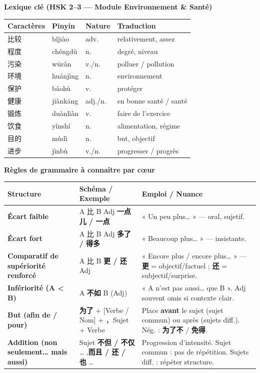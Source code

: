 \documentclass[11pt]{article}
\begin{document}
\begin{bilan}

\textbf{Lexique clé (HSK 2–3 — Module Environnement \& Santé)}
\begin{center}
\begin{tabularx}{\linewidth}{|X|X|X|X|}
\hline
\rowcolor{popblueL} \textbf{Caractères} & \textbf{Pinyin} & \textbf{Nature} & \textbf{Traduction} \\ \hline
比较 & bǐjiào & adv. & relativement, assez \\
程度 & chéngdù & n. & degré, niveau \\
污染 & wūrǎn & v./n. & polluer / pollution \\
环境 & huánjìng & n. & environnement \\
保护 & bǎohù & v. & protéger \\
健康 & jiànkāng & adj./n. & en bonne santé / santé \\
锻炼 & duànliàn & v. & faire de l'exercice \\
饮食 & yǐnshí & n. & alimentation, régime \\
目的 & mùdì & n. & but, objectif \\
进步 & jìnbù & v./n. & progresser / progrès \\
\hline
\end{tabularx}
\end{center}

\textbf{Règles de grammaire à connaître par cœur}
\begin{center}
\begin{tabularx}{\linewidth}{|X|X|X|}
\hline
\rowcolor{popblueL} \textbf{Structure} & \textbf{Schéma / Exemple} & \textbf{Emploi / Nuance} \\ \hline
\textbf{Écart faible} & A 比 B Adj \textbf{一点儿 / 一点} & « Un peu plus… » — oral, sujetif. \\ \hline
\textbf{Écart fort} & A 比 B Adj \textbf{多了 / 得多} & « Beaucoup plus… » — insistante. \\ \hline
\textbf{Comparatif de supériorité renforcé} & A 比 B \textbf{更 / 还} Adj & « Encore plus / encore plus… » — \textbf{更} = objectif/factuel ; \textbf{还} = subjectif/surprise. \\ \hline
\textbf{Infériorité (A < B)} & A \textbf{不如} B (Adj) & « A n'est pas aussi… que B ». Adj souvent omis si contexte clair. \\ \hline
\textbf{But (afin de / pour)} & \textbf{为了} + [Verbe / Nom] + ，Sujet + Verbe & Place \textbf{avant} le sujet (sujet commun) ou après (sujets diff.). Nég. : \textbf{为了不} / \textbf{免得}. \\ \hline
\textbf{Addition (non seulement… mais aussi)} & Sujet \textbf{不但 / 不仅} … ,\textbf{而且 / 还 / 也} … & Progression d'intensité. Sujet commun : pas de répétition. Sujets diff. : répéter structure. \\ \hline
\end{tabularx}
\end{center}


\end{bilan}
\end{document}
